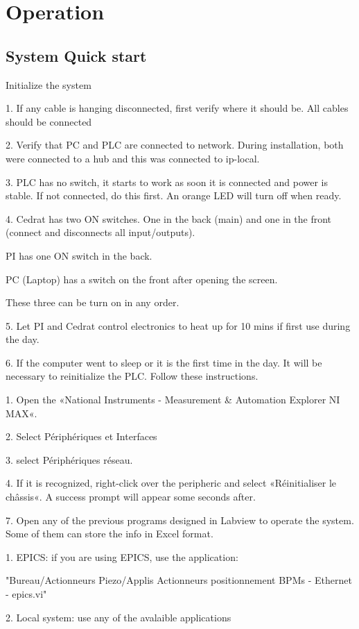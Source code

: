 \chapter{Operation}
\section{System Quick start}

Initialize the system\par
1. If any cable is hanging disconnected, first verify where it should be. All cables should be connected\par
2. Verify that PC and PLC are connected to network. During installation, both were connected to a hub and this was connected to ip-local.\par
3. PLC has no switch, it starts to work as soon it is connected and power is stable. If not connected, do this first. An orange LED will turn off when ready.\par
4. Cedrat has two ON switches. One in the back (main) and one in the front (connect and disconnects all input/outputs).\par
PI has one ON switch in the back.\par
PC (Laptop) has a switch on the front after opening the screen.\par
These three can be turn on in any order.\par
5. Let PI and Cedrat control electronics to heat up for 10 mins if first use during the day.\par
6. If the computer went to sleep or it is the first time in the day. It will be necessary to reinitialize the PLC. Follow these instructions.\par
1. Open the «National Instruments - Measurement \& Automation Explorer NI MAX«.\par
2. Select Périphériques et Interfaces\par
3. select Périphériques réseau.\par
4. If it is recognized, right-click over the peripheric and select «Réinitialiser le châssis«. A success prompt will appear some seconds after.\par
7. Open any of the previous programs designed in Labview to operate the system. Some of them can store the info in Excel format.\par
1. EPICS: if you are using EPICS, use the application:\par
"Bureau/Actionneurs Piezo/Applis Actionneurs positionnement BPMs - Ethernet - epics.vi" \par
2. Local system: use any of the avalaible applications\par

